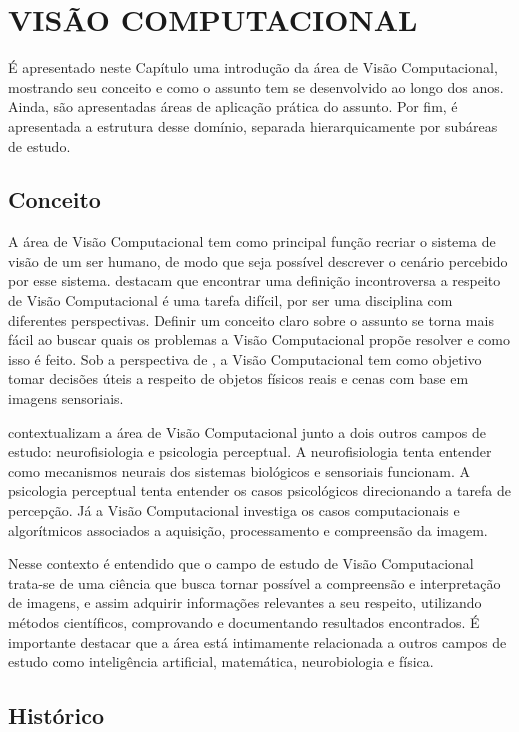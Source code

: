 \chapter{VISÃO COMPUTACIONAL}

É apresentado neste Capítulo uma introdução da área de Visão Computacional, mostrando seu conceito e como o assunto tem se desenvolvido ao longo dos anos. Ainda, são apresentadas áreas de aplicação prática do assunto. Por fim, é apresentada a estrutura desse domínio, separada hierarquicamente por subáreas de estudo.

\section{Conceito}

A área de Visão Computacional tem como principal função recriar o sistema de visão de um ser humano, de modo que seja possível descrever o cenário percebido por esse sistema.  destacam que encontrar uma definição incontroversa a respeito de Visão Computacional é uma tarefa difícil, por ser uma disciplina com diferentes perspectivas. Definir um conceito claro sobre o assunto se torna mais fácil ao buscar quais os problemas a Visão Computacional propõe resolver e como isso é feito. Sob a perspectiva de , a Visão Computacional tem como objetivo tomar decisões úteis a respeito de objetos físicos reais e cenas com base em imagens sensoriais.

 contextualizam a área de Visão Computacional junto a dois outros campos de estudo: neurofisiologia e psicologia perceptual. A neurofisiologia tenta entender como mecanismos neurais dos sistemas biológicos e sensoriais funcionam. A psicologia perceptual tenta entender os casos psicológicos direcionando a tarefa de percepção. Já a Visão Computacional investiga os casos computacionais e algorítmicos associados a aquisição, processamento e compreensão da imagem.

Nesse contexto é entendido que o campo de estudo de Visão Computacional trata-se de uma ciência que busca tornar possível a compreensão e interpretação de imagens, e assim adquirir informações relevantes a seu respeito, utilizando métodos científicos, comprovando e documentando resultados encontrados. É importante destacar que a área está intimamente relacionada a outros campos de estudo como inteligência artificial, matemática, neurobiologia e física.

\section{Histórico}

